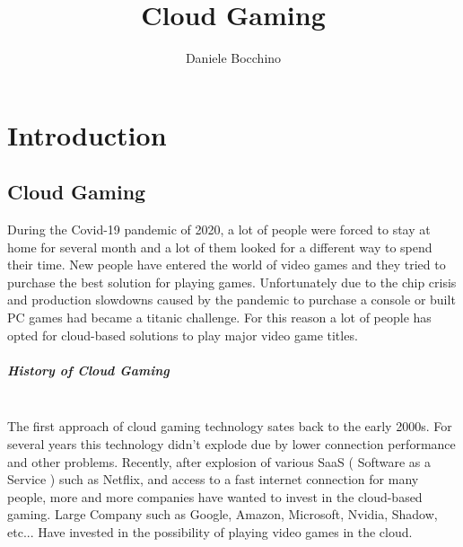 \documentclass[a4paper,12pt]{report}
\begin{document}
  

\title{Cloud Gaming}
\author{Daniele Bocchino}


\beforepreface
\textbf{}
\afterpreface
%
%
%			
\chapter{Introduction}
\label{cap1}
%
%
\section{Cloud Gaming}
During the Covid-19 pandemic of 2020, a lot of people were forced to stay at home for several month and  a lot of them looked for a different way to spend their time. New people have entered the world of video games and they tried to purchase the best solution for playing games. Unfortunately due to the chip crisis and production slowdowns caused by the pandemic to purchase a console or built PC games had became a titanic challenge. For this reason a lot of people has opted for cloud-based solutions to play major video game titles.\\
%
\paragraph{History of Cloud Gaming\\\\}
The first approach of cloud gaming technology sates back to the early 2000s. For several years this technology didn't explode due by lower connection performance  and other problems. Recently, after explosion of various SaaS ( Software as a Service ) such as Netflix, and access to a fast internet connection for many people, more and more companies have wanted to invest in the cloud-based gaming. Large Company such as Google, Amazon, Microsoft, Nvidia, Shadow, etc... Have invested in the possibility of playing video games in the cloud.\\

%
\end{document}

